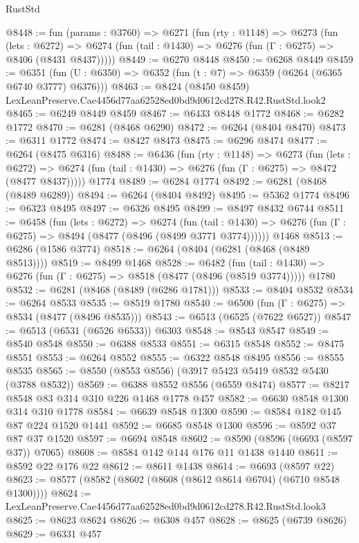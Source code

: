 \begin{lexlean}{RustStd}
\begin{coremodule}
@8448 := fun (params : @3760) =>
  @6271
    (fun (rty : @1148) =>
    @6273
      (fun (lets : @6272) =>
      @6274 (fun (tail : @1430) => @6276 (fun (Γ : @6275) => @8406 (@8431 @8437)))))
@8449 := @6270 @8448
@8450 := @6268 @8449
@8459 := @6351 (fun (U : @6350) => @6352 (fun (t : @7) => @6359 (@6264 (@6365 @6740 @3777) @6376)))
@8463 := @8424 (@8450 @8459) LexLeanPreserve.Cae4456d77aa62528ed0bd9d0612cd278.R42.RustStd.look2
@8465 := @6249 @8449 @8459
@8467 := @6433 @8448 @1772
@8468 := @6282 @1772
@8470 := @6281 (@8468 @6290)
@8472 := @6264 (@8404 @8470)
@8473 := @6311 @1772
@8474 := @8427 @8473
@8475 := @6296 @8474
@8477 := @6264 (@8475 @6316)
@8488 := @6436
    (fun (rty : @1148) =>
    @6273
      (fun (lets : @6272) =>
      @6274 (fun (tail : @1430) => @6276 (fun (Γ : @6275) => @8472 (@8477 @8437)))))
    @1774
@8489 := @6284 @1774
@8492 := @6281 (@8468 (@8489 @6289))
@8494 := @6264 (@8404 @8492)
@8495 := @5362 @1774
@8496 := @6323 @8495
@8497 := @6326 @8495
@8499 := @8497 @8432 @6744
@8511 := @6458
    (fun (lets : @6272) =>
    @6274
      (fun (tail : @1430) => @6276 (fun (Γ : @6275) => @8494 (@8477 (@8496 (@8499 @3771 @3774))))))
    @1468
@8513 := @6286 (@1586 @3774)
@8518 := @6264 (@8404 (@6281 (@8468 (@8489 @8513))))
@8519 := @8499 @1468
@8528 := @6482
    (fun (tail : @1430) => @6276 (fun (Γ : @6275) => @8518 (@8477 (@8496 (@8519 @3774)))))
    @1780
@8532 := @6281 (@8468 (@8489 (@6286 @1781)))
@8533 := @8404 @8532
@8534 := @6264 @8533
@8535 := @8519 @1780
@8540 := @6500 (fun (Γ : @6275) => @8534 (@8477 (@8496 @8535)))
@8543 := @6513 (@6525 (@7622 @6527))
@8547 := @6513 (@6531 (@6526 @6533)) @6303
@8548 := @8543 @8547
@8549 := @8540 @8548
@8550 := @6388 @8533
@8551 := @6315 @8548
@8552 := @8475 @8551
@8553 := @6264 @8552
@8555 := @6322 @8548 @8495
@8556 := @8555 @8535
@8565 := @8550 (@8553 @8556) (@3917 @5423 @5419 @8532 @5430 (@3788 @8532))
@8569 := @6388 @8552 @8556 (@6559 @8474)
@8577 := @8217 @8548 @83 @314 @310 @226 @1468 @1778 @457
@8582 := @6630 @8548 @1300 @314 @310 @1778
@8584 := @6639 @8548 @1300
@8590 := @8584 @182 @145 @87 @224 @1520 @1441
@8592 := @6685 @8548 @1300
@8596 := @8592 @37 @87 @37 @1520
@8597 := @6694 @8548
@8602 := @8590 (@8596 (@6693 (@8597 @37)) @7065)
@8608 := @8584 @142 @144 @176 @11 @1438 @1440
@8611 := @8592 @22 @176 @22
@8612 := @8611 @1438
@8614 := @6693 (@8597 @22)
@8623 := @8577 (@8582 (@8602 (@8608 (@8612 @8614 @6704) (@6710 @8548 @1300))))
@8624 := LexLeanPreserve.Cae4456d77aa62528ed0bd9d0612cd278.R42.RustStd.look3
@8625 := @8623 @8624
@8626 := @6308 @457
@8628 := @8625 (@6739 @8626)
@8629 := @6331 @457

\end{coremodule}
\end{lexlean}
